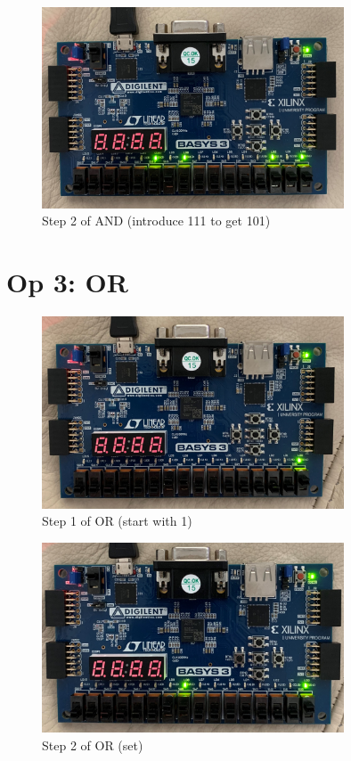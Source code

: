 \documentclass[11pt]{article}
\begin{document}
\begin{figure}[ht]\centering
	\includegraphics[width=0.8\textwidth,trim=0cm 0cm 0cm 0cm,clip]{and_step_2}
	\caption{Step 2 of AND (introduce 111 to get 101)}
	\label{fig:and_step_2}			
\end{figure}
\clearpage

\section*{Op 3: OR}

\begin{figure}[ht]\centering
	\includegraphics[width=0.8\textwidth,trim=0cm 0cm 0cm 0cm,clip]{or_step_1}
	\caption{Step 1 of OR (start with 1)}
	\label{fig:or_step_1}			
\end{figure}

\begin{figure}[ht]\centering
	\includegraphics[width=0.8\textwidth,trim=0cm 0cm 0cm 0cm,clip]{or_step_2}
	\caption{Step 2 of OR (set)}
	\label{fig:or_step_2}			
\end{figure}
\end{document}
